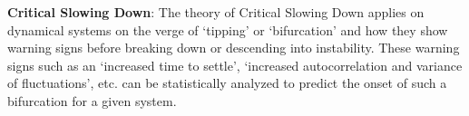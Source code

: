 \textbf{Critical Slowing Down}: The theory of Critical Slowing Down applies on dynamical systems on the verge of `tipping' or `bifurcation' and how they show warning signs before breaking down or descending into instability. These warning signs such as an `increased time to settle', `increased autocorrelation and variance of fluctuations', etc. \cite{schefferEarlyWarningSignalsForCriticalTransitions} can be statistically analyzed to predict the onset of such a bifurcation for a given system.

